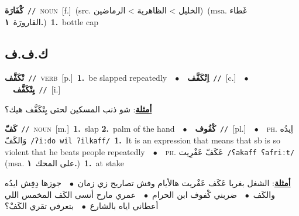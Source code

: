 \documentclass[10pt,a4paper,twoside]{article} %
\begin{document}
\begin{multicols}{2}
{\setlength\topsep{0pt}\textbf{\foreignlanguage{arabic}{كْفَارَة}}\ {\color{gray}\texttt{//}\color{black}}\ \textsc{noun}\ [f.]\ (src. \color{gray}\foreignlanguage{arabic}{الخليل > الظاهرية > الرماضين}\color{black})\ \color{gray}(msa. \foreignlanguage{arabic}{غَطاء القارورَة}~\foreignlanguage{arabic}{\textbf{١.}})\color{black}\ \textbf{1.}~bottle cap\ } \vspace{2mm}

\vspace{-3mm}
\subsection*{\color{blue}\foreignlanguage{arabic}{ك.ف.ف}\color{blue}{}} 

{\setlength\topsep{0pt}\textbf{\foreignlanguage{arabic}{تْكَفَّف}}\ {\color{gray}\texttt{//}\color{black}}\ \textsc{verb}\ [p.]\ \textbf{1.}~be slapped repeatedly\ \ $\bullet$\ \ \setlength\topsep{0pt}\textbf{\foreignlanguage{arabic}{اِتْكَفَّف}}\ {\color{gray}\texttt{//}\color{black}}\ [c.]\ \ $\bullet$\ \ \setlength\topsep{0pt}\textbf{\foreignlanguage{arabic}{يِتْكَفَّف}}\ {\color{gray}\texttt{//}\color{black}}\ [i.]\  \begin{flushright}\color{gray}\foreignlanguage{arabic}{\textbf{\underline{\foreignlanguage{arabic}{أمثلة}}}: شو ذنب المسكين لحتى يِتْكَفَّف هيك؟}\end{flushright}\color{black}} \vspace{2mm}

{\setlength\topsep{0pt}\textbf{\foreignlanguage{arabic}{كَفّ}}\ {\color{gray}\texttt{//}\color{black}}\ \textsc{noun}\ [m.]\ \textbf{1.}~slap  \textbf{2.}~palm of the hand\ \ $\bullet$\ \ \setlength\topsep{0pt}\textbf{\foreignlanguage{arabic}{كْفُوف}}\ {\color{gray}\texttt{//}\color{black}}\ [pl.]\ \ $\bullet$\ \ \textsc{ph.} \color{gray} \foreignlanguage{arabic}{اِيدُه وَالكَفّ}\color{black}\ {\color{gray}\texttt{/{\sffamily ʔiːdo wil ʔilkaff}/}\color{black}}\ \textbf{1.}~It is an expression that means that sb is so violent that he beats people repeatedly\ \ $\bullet$\ \ \textsc{ph.} \color{gray} \foreignlanguage{arabic}{عَكَفّ عَفْرِيت}\color{black}\ {\color{gray}\texttt{/{\sffamily ʕakaff ʕafriːt}/}\color{black}}\ \color{gray} (msa. \foreignlanguage{arabic}{على المحك}~\foreignlanguage{arabic}{\textbf{١.}})\color{black}\ \textbf{1.}~at stake\  \begin{flushright}\color{gray}\foreignlanguage{arabic}{\textbf{\underline{\foreignlanguage{arabic}{أمثلة}}}: الشغل بغربا عَكَف عَفْريت هالأيام وفش تصاريح زي زمان\ $\bullet$\ \  جوزها دِفِش ايدُه والكَف\ $\bullet$\ \  ضربني كْفوف ابن الحرام\ $\bullet$\ \  عمري مارح أنسى الكَف المخمس اللي أعطاني اياه بالشارع\ $\bullet$\ \  بتعرفي تقري الكَفْ؟}\end{flushright}\color{black}} \vspace{2mm}


\end{multicols}
\end{document}
